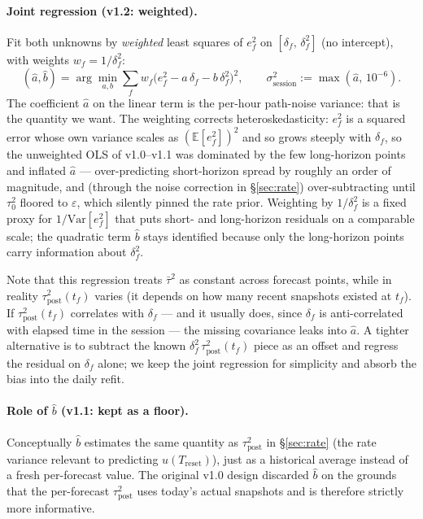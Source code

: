 \documentclass[11pt]{article}
\newcommand{\taupostsq}{\tau_{\text{post}}^2}
\newcommand{\tauzerosq}{\tau_0^2}
\newcommand{\sigsessionsq}{\sigma_{\text{session}}^2}
\newcommand{\Treset}{T_{\text{reset}}}
\begin{document}
\paragraph{Joint regression (v1.2: weighted).} Fit both unknowns by
\emph{weighted} least squares of $e_f^2$ on $[\delta_f,\, \delta_f^2]$ (no
intercept), with weights $w_f = 1/\delta_f^2$:
\[
  (\hat a, \hat b)
    = \arg\min_{a, b} \sum_f w_f\bigl(e_f^2 - a\,\delta_f - b\,\delta_f^2\bigr)^2,
  \qquad
  \sigsessionsq := \max(\hat a,\, 10^{-6}).
\]
The coefficient $\hat a$ on the linear term is the per-hour path-noise
variance: that is the quantity we want. The weighting corrects
heteroskedasticity: $e_f^2$ is a squared error whose own variance scales as
$(\mathbb{E}[e_f^2])^2$ and so grows steeply with $\delta_f$, so the unweighted
OLS of v1.0--v1.1 was dominated by the few long-horizon points and inflated
$\hat a$ --- over-predicting short-horizon spread by roughly an order of
magnitude, and (through the noise correction in \S\ref{sec:rate})
over-subtracting until $\tauzerosq$ floored to $\varepsilon$, which silently
pinned the rate prior. Weighting by $1/\delta_f^2$ is a fixed proxy for
$1/\mathrm{Var}[e_f^2]$ that puts short- and long-horizon residuals on a
comparable scale; the quadratic term $\hat b$ stays identified because only the
long-horizon points carry information about $\delta_f^2$.

Note that this regression treats $\bar\tau^2$ as constant across forecast
points, while in reality $\taupostsq(t_f)$ varies (it depends on how many
recent snapshots existed at $t_f$). If $\taupostsq(t_f)$ correlates with
$\delta_f$ --- and it usually does, since $\delta_f$ is anti-correlated with
elapsed time in the session --- the missing covariance leaks into $\hat a$.
A tighter alternative is to subtract the known $\delta_f^2\,\taupostsq(t_f)$
piece as an offset and regress the residual on $\delta_f$ alone; we keep
the joint regression for simplicity and absorb the bias into the daily
refit.

\paragraph{Role of $\hat b$ (v1.1: kept as a floor).} Conceptually $\hat b$
estimates the same quantity as $\taupostsq$ in \S\ref{sec:rate} (the rate
variance relevant to predicting $u(\Treset)$), just as a historical average
instead of a fresh per-forecast value. The original v1.0 design discarded
$\hat b$ on the grounds that the per-forecast $\taupostsq$ uses today's
actual snapshots and is therefore strictly more informative.
\end{document}
